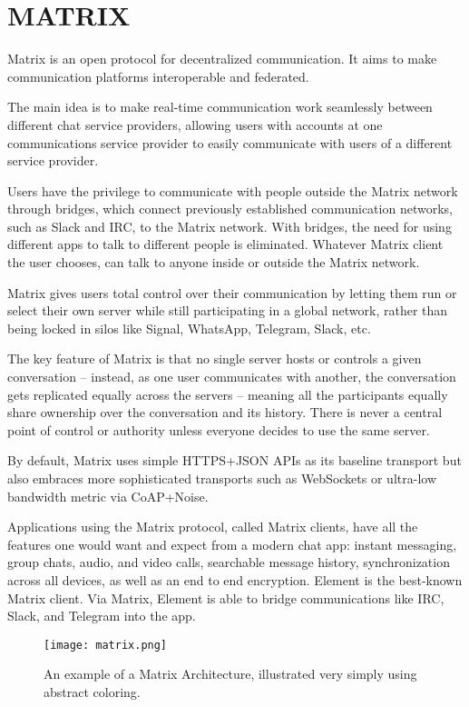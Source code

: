 \section{MATRIX}

Matrix is an open protocol for decentralized communication. It aims to make 
communication platforms interoperable and federated.

The main idea is to make real-time communication work seamlessly between different chat 
service providers, allowing users with accounts at one communications service provider to 
easily communicate with users of a different service provider.

Users have the privilege to communicate with people outside the Matrix network through bridges, 
which connect previously established communication networks, such as Slack and IRC, to the Matrix network.
With bridges, the need for using different apps to talk to different people is eliminated. Whatever Matrix client the user chooses, can talk to anyone inside or outside the Matrix network.

Matrix gives users total control over their communication by letting them run or select their own 
server while still participating in a global network, rather than being locked in silos 
like Signal, WhatsApp, Telegram, Slack, etc. 

The key feature of Matrix is that no single server hosts or controls a given conversation -- instead, 
as one user communicates with another, the conversation gets replicated equally across the servers -- meaning 
all the participants equally share ownership over the conversation and its history. 
There is never a central point of control or authority unless everyone decides to use the same server.~\cite{MATRIXorgOpenProtocol}

By default, Matrix uses simple HTTPS+JSON APIs as its baseline transport but also embraces 
more sophisticated transports such as WebSockets or ultra-low bandwidth metric via CoAP+Noise.~\cite{MATRIX}

Applications using the Matrix protocol, called Matrix clients, have all the features one would
want and expect from a modern chat app: instant messaging, group chats, audio, and video calls, 
searchable message history, synchronization across all devices, as well as an end to end encryption.
Element is the best-known Matrix client.
Via Matrix, Element is able to bridge communications like IRC, Slack, and Telegram into the app.~\cite{RumaMATRIX}

\begin{figure}[h]
    \begin{center}
        \texttt{[image: matrix.png]}
    \end{center}
    \caption{An example of a Matrix Architecture, illustrated very simply using abstract coloring.}
    \label{fig:matrix}
\end{figure}

